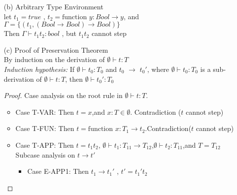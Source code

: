 \documentclass{article}
\begin{document}
\begin{description}
\begin{enumerate}
\begin{proof}
\begin{itemize}
\begin{itemize}
                                        Then $t \rightarrow t' = v_1 t_2'$ by E-APP2
                                    \item Case Both $t_1$ and $t_2$ are values\\
                                        Then, $t \rightarrow t' = [x \rightarrow v_2]t_{12}$ by E-APPBETA
                                \end{itemize}
                        \end{itemize}
                    \end{proof}
                \item[(b)]{Arbitrary Type Environment}\\ let $t_1 = true$ , $t_2 = \text{function \ } y:Bool \rightarrow  y $, and $\Gamma = \{(t_1,(Bool \rightarrow Bool) \rightarrow Bool)\}$\\
                   Then $\Gamma \vdash t_1 t_2: bool$ , but $t_1 t_2$ cannot step
                \item[(c)]{Proof of Preservation Theorem}\\
                    By induction on the derivation of $\emptyset \vdash t:T$\\
                    \textit{Induction hypothesis:} If $\emptyset \vdash t_0:T_0$ and $t_0$ $\rightarrow$ $t_0'$, where $\emptyset \vdash t_0:T_0$ is a sub-derivation of $\emptyset \vdash t:T$, then $\emptyset \vdash t_0':T_0$
                    \begin{proof}
                        Case analysis on the root rule in $\emptyset \vdash t:T$.
                        \begin{itemize}
                            \item Case T-VAR: Then $t = x$,and $x:T \in \emptyset$. Contradiction ($t$ cannot step)
                            \item Case T-FUN: Then $t = \text{function\ } x:T_1 \rightarrow t_2 $.Contradiction($t$ cannot step)
                            \item Case T-APP: Then $t = t_1 t_2$, $\emptyset \vdash t_1: T_{11} \rightarrow T_{12}$,\space  $\emptyset \vdash t_2:T_{11}$,\space and $T=T_{12}$\\
                            Subcase analysis on $t \rightarrow t'$
                            \begin{itemize}
                                \item Case E-APP1: Then $t_1 \rightarrow t_1'$ , $t' = t_1't_2$\\

\end{itemize}
\end{itemize}
\end{proof}
\end{enumerate}
\end{description}
\end{document}
